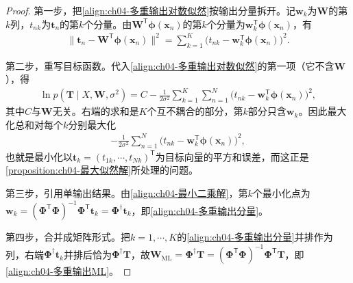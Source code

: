 \documentclass[../../main.tex]{subfiles}
\begin{document}
\begin{proof}
第一步，把\eqref{align:ch04-多重输出对数似然}按输出分量拆开。记$\boldsymbol{w}_k$为$\boldsymbol{W}$的第$k$列，$t_{nk}$为$\boldsymbol{t}_n$的第$k$个分量。由$\boldsymbol{W}^{\mathsf{T}}\boldsymbol{\phi}(\boldsymbol{x}_n)$的第$k$个分量为$\boldsymbol{w}_k^{\mathsf{T}}\boldsymbol{\phi}(\boldsymbol{x}_n)$，有
\begin{align*}
  \bigl\|\boldsymbol{t}_n-\boldsymbol{W}^{\mathsf{T}}\boldsymbol{\phi}(\boldsymbol{x}_n)\bigr\|^2
  =\sum_{k=1}^{K}\bigl(t_{nk}-\boldsymbol{w}_k^{\mathsf{T}}\boldsymbol{\phi}(\boldsymbol{x}_n)\bigr)^2 .
\end{align*}

第二步，重写目标函数。代入\eqref{align:ch04-多重输出对数似然}的第一项（它不含$\boldsymbol{W}$），得
\begin{align*}
  \ln p(\boldsymbol{T}\mid X,\boldsymbol{W},\sigma^2)
  =C-\frac{1}{2\sigma^2}\sum_{k=1}^{K}\sum_{n=1}^{N}\bigl(t_{nk}-\boldsymbol{w}_k^{\mathsf{T}}\boldsymbol{\phi}(\boldsymbol{x}_n)\bigr)^2,
\end{align*}
其中$C$与$\boldsymbol{W}$无关。右端的求和是$K$个互不耦合的部分，第$k$部分只含$\boldsymbol{w}_k$。因此最大化总和对每个$k$分别最大化
\begin{align*}
  -\frac{1}{2\sigma^2}\sum_{n=1}^{N}\bigl(t_{nk}-\boldsymbol{w}_k^{\mathsf{T}}\boldsymbol{\phi}(\boldsymbol{x}_n)\bigr)^2,
\end{align*}
也就是最小化以$\boldsymbol{t}_k=(t_{1k},\cdots,t_{Nk})^{\mathsf{T}}$为目标向量的平方和误差，而这正是\cref{proposition:ch04-最大似然解}所处理的问题。

第三步，引用单输出结果。由\eqref{align:ch04-最小二乘解}，第$k$个最小化点为$\boldsymbol{w}_k=(\boldsymbol{\Phi}^{\mathsf{T}}\boldsymbol{\Phi})^{-1}\boldsymbol{\Phi}^{\mathsf{T}}\boldsymbol{t}_k=\boldsymbol{\Phi}^{\dagger}\boldsymbol{t}_k$，即\eqref{align:ch04-多重输出分量}。

第四步，合并成矩阵形式。把$k=1,\cdots,K$的\eqref{align:ch04-多重输出分量}并排作为列，右端$\boldsymbol{\Phi}^{\dagger}\boldsymbol{t}_k$并排后恰为$\boldsymbol{\Phi}^{\dagger}\boldsymbol{T}$，故$\boldsymbol{W}_{\mathrm{ML}}=\boldsymbol{\Phi}^{\dagger}\boldsymbol{T}=(\boldsymbol{\Phi}^{\mathsf{T}}\boldsymbol{\Phi})^{-1}\boldsymbol{\Phi}^{\mathsf{T}}\boldsymbol{T}$，即\eqref{align:ch04-多重输出ML}。
\end{proof}
\end{document}
